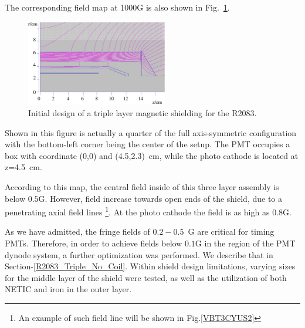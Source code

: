 \documentclass[12pt]{article}
\begin{document}
The corresponding field map at 1000G is  also shown  in Fig.~\ref{R2083_Initial}. 
%
\begin{figure}[htbp]
\centering
\includegraphics[width=0.55\textwidth]{R2083_NETIC_hiperm49_CONETIC_standardDesign.eps}
\caption{\small{Initial design of a triple layer magnetic shielding for the R2083.}}
\label{R2083_Initial}
\end{figure}
%
Shown in this figure is actually  a quarter of the full axis-symmetric configuration
with the bottom-left corner being the center of the setup. 
The PMT  occupies a box with coordinate (0,0) and (4.5,2.3)~cm,  while the  photo 
cathode is located at  z=4.5~cm. 

According to this map, the central  field  inside of this  three layer assembly 
is  below $0.5$G. 
However,  field  increase towards   open ends of the shield, due to a
penetrating  axial field lines
\footnote{An example of such  field line will be shown  in Fig.\ref{VBT3CYUS2}}. 
At the photo cathode the field  is as high as  $0.8$G.  

As we have admitted,  the fringe  fields  of $0.2-0.5$~G are 
critical  for  timing PMTs. Therefore, in order to achieve fields  below $0.1$G in 
the region of the PMT dynode system, a further optimization was performed.  
We describe that  in  Section-\ref{R2083_Triple_No_Coil}.  
Within shield design  limitations, varying sizes 
for the middle layer of the shield were tested, as well as the utilization of both NETIC and 
iron in the outer layer.
\end{document}
